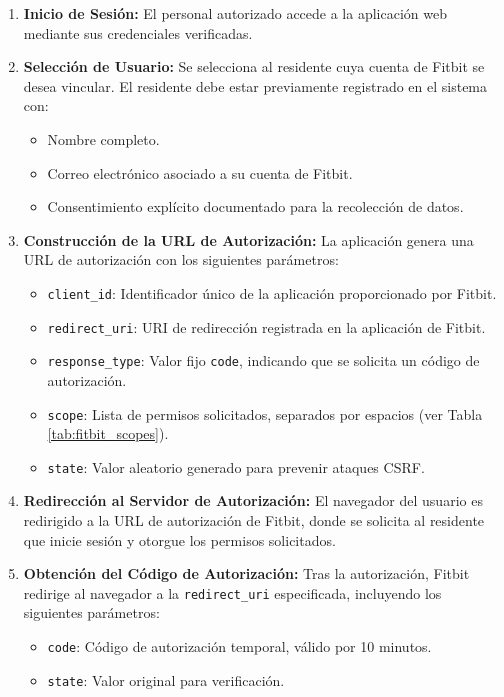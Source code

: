 \begin{enumerate}
    \item \textbf{Inicio de Sesión:} El personal autorizado accede a la aplicación web mediante sus credenciales verificadas.
    
    \item \textbf{Selección de Usuario:} Se selecciona al residente cuya cuenta de Fitbit\textsuperscript{\textregistered} se desea vincular. El residente debe estar previamente registrado en el sistema con:
    \begin{itemize}
        \item Nombre completo.
        \item Correo electrónico asociado a su cuenta de Fitbit\textsuperscript{\textregistered}.
        \item Consentimiento explícito documentado para la recolección de datos.
    \end{itemize}
    
    \item \textbf{Construcción de la URL de Autorización:} La aplicación genera una URL de autorización con los siguientes parámetros:
    \begin{itemize}
        \item \texttt{client\_id}: Identificador único de la aplicación proporcionado por Fitbit.
        \item \texttt{redirect\_uri}: URI de redirección registrada en la aplicación de Fitbit.
        \item \texttt{response\_type}: Valor fijo \texttt{code}, indicando que se solicita un código de autorización.
        \item \texttt{scope}: Lista de permisos solicitados, separados por espacios (ver Tabla \ref{tab:fitbit_scopes}).
        \item \texttt{state}: Valor aleatorio generado para prevenir ataques CSRF.
    \end{itemize}
    
    \item \textbf{Redirección al Servidor de Autorización:} El navegador del usuario es redirigido a la URL de autorización de Fitbit, donde se solicita al residente que inicie sesión y otorgue los permisos solicitados.
    
    \item \textbf{Obtención del Código de Autorización:} Tras la autorización, Fitbit redirige al navegador a la \texttt{redirect\_uri} especificada, incluyendo los siguientes parámetros:
    \begin{itemize}
        \item \texttt{code}: Código de autorización temporal, válido por 10 minutos.
        \item \texttt{state}: Valor original para verificación.
    \end{itemize}
    

\end{enumerate}
